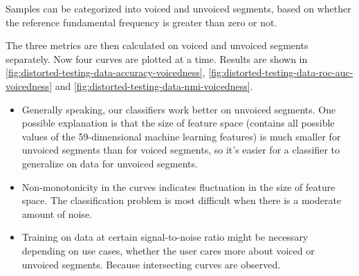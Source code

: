 \documentclass[11pt,a4paper]{report}
\begin{document}
Samples can be categorized into voiced and unvoiced segments, based on whether the reference fundamental frequency is greater than zero or not.

The three metrics are then calculated on voiced and unvoiced segments separately.
Now four curves are plotted at a time.
Results are shown in \autoref{fig:distorted-testing-data-accuracy-voicedness}, \autoref{fig:distorted-testing-data-roc-auc-voicedness} and \autoref{fig:distorted-testing-data-nmi-voicedness}.

\begin{itemize}
  \item Generally speaking, our classifiers work better on unvoiced segments.
    One possible explanation is that the size of feature space (contains all possible values of the 59-dimensional machine learning features) is much smaller for unvoiced segments than for voiced segments, so it's easier for a classifier to generalize on data for unvoiced segments.
  \item Non-monotonicity in the curves indicates fluctuation in the size of feature space.
    The classification problem is most difficult when there is a moderate amount of noise.
  \item Training on data at certain signal-to-noise ratio might be necessary depending on use cases, whether the user cares more about voiced or unvoiced segments.
    Because intersecting curves are observed.
\end{itemize}
\end{document}

